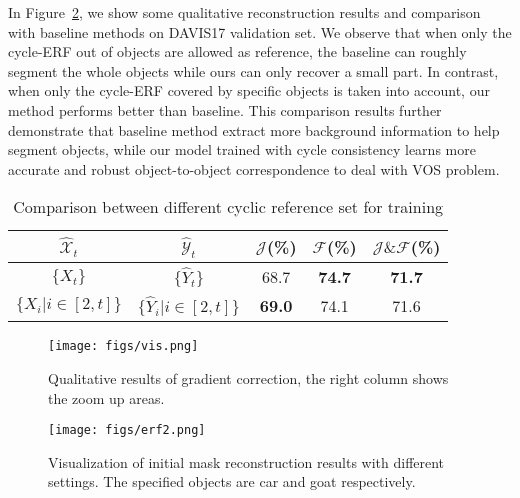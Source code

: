 \documentclass{article}
\begin{document}
In Figure~\ref{fig:erf}, we show some qualitative reconstruction results and comparison with baseline methods on DAVIS17 validation set. We observe that when only the cycle-ERF out of objects are allowed as reference, the baseline can roughly segment the whole objects while ours can only recover a small part. In contrast, when only the cycle-ERF covered by specific objects is taken into account, our method performs better than baseline. This comparison results further demonstrate that baseline method extract more background information to help segment objects, while our model trained with cycle consistency learns more accurate and robust object-to-object correspondence to deal with VOS problem.
\begin{table}
    \centering
    \begin{tabular}{c|c|ccc}\hline
        $\widehat{\mathcal{X}}_t$ & ${\widehat{\mathcal{Y}}_t}$ & $\mathcal{J}$(\%) & $\mathcal{F}$(\%) & $\mathcal{J}\&\mathcal{F}$(\%) \\\hline
        $\{X_t\}$ & $\{\widehat{Y}_t\}$ & 68.7 & \textbf{74.7} & \textbf{71.7} \\
        $\{X_i|i\in [2, t]\}$ & $\{\widehat{Y}_i | i \in [2, t]\}$ & \textbf{69.0} & 74.1 & 71.6 \\\hline
    \end{tabular}
    \caption{Comparison between different cyclic reference set for training}
    \label{tab:cyclic}
\end{table}

\begin{figure}
    \centering
    \small
    \texttt{[image: figs/vis.png]}
    \caption{Qualitative results of gradient correction, the right column shows the zoom up areas.}
    \label{fig:correction}
    \vspace{-3mm}
\end{figure}

\begin{figure}[t]
    \centering
    \texttt{[image: figs/erf2.png]}
    \caption{Visualization of initial mask reconstruction results with different settings. The specified objects are car and goat respectively.}
    \label{fig:erf}
\end{figure}
\end{document}
